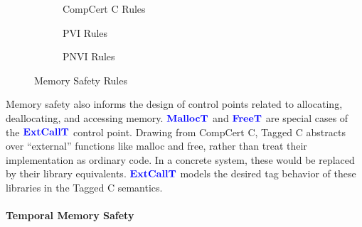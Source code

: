 \documentclass{llncs}
\begin{document}
\begin{figure}
\begin{subfigure}{0.4\textwidth}
    
    \caption{CompCert C Rules}
    \label{subfig:memcompcert}
  \end{subfigure}
  \begin{subfigure}{0.3\textwidth}
    \scriptsize



    
    \caption{PVI Rules}
    \label{subfig:pvi}
  \end{subfigure}
  \begin{subfigure}{0.3\textwidth}
    \scriptsize
    


    
    \caption{PNVI Rules}
    \label{subfig:pnvi}
  \end{subfigure}
  
    \caption{Memory Safety Rules}
    \label{fig:memcommon}
  \end{figure}

Memory safety also informs the design of control points related to allocating, deallocating, and
accessing memory. \(\color{blue} \mathbf{MallocT}\) and \(\color{blue} \mathbf{FreeT}\) are special cases of the
\(\color{blue} \mathbf{ExtCallT}\) control point. Drawing from CompCert C, Tagged C abstracts over
``external'' functions like malloc and free, rather than treat their implementation as
ordinary code. In a concrete system, these would be replaced by their library equivalents.
\(\color{blue} \mathbf{ExtCallT}\) models the desired tag behavior of these libraries in the Tagged C semantics.

\paragraph*{Temporal Memory Safety}
\end{document}
